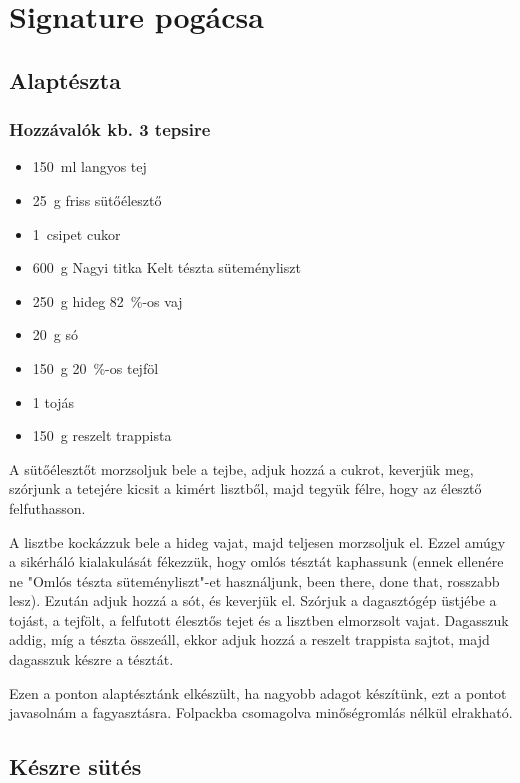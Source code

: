 \newpage
\section*{Signature pogácsa}

\subsection*{Alaptészta}
\subsubsection*{Hozzávalók kb. 3 tepsire}
\begin{itemize}
    \item \qty{150}{\ml} langyos tej
    \item \qty{25}{\g} friss sütőélesztő
    \item \qty{1}{csipet} cukor
    \item \qty{600}{\g} Nagyi titka Kelt tészta süteményliszt
    \item \qty{250}{\g} hideg \qty{82}{\percent}-os vaj
    \item \qty{20}{\g} só
    \item \qty{150}{g} \qty{20}{\percent}-os tejföl
    \item \num{1} tojás
    \item \qty{150}{\g} reszelt trappista
\end{itemize}

A sütőélesztőt morzsoljuk bele a tejbe, adjuk hozzá a cukrot, keverjük meg, szórjunk a tetejére kicsit a kimért lisztből, majd tegyük félre, hogy az élesztő felfuthasson.

A lisztbe kockázzuk bele a hideg vajat, majd teljesen morzsoljuk el. Ezzel amúgy a sikérháló kialakulását fékezzük, hogy omlós tésztát kaphassunk (ennek ellenére ne "Omlós tészta süteményliszt"-et használjunk, been there, done that, rosszabb lesz). Ezután adjuk hozzá a sót, és keverjük el. Szórjuk a dagasztógép üstjébe a tojást, a tejfölt, a felfutott élesztős tejet és a lisztben elmorzsolt vajat. Dagasszuk addig, míg a tészta összeáll, ekkor adjuk hozzá a reszelt trappista sajtot, majd dagasszuk készre a tésztát.

Ezen a ponton alaptésztánk elkészült, ha nagyobb adagot készítünk, ezt a pontot javasolnám a fagyasztásra. Folpackba csomagolva minőségromlás nélkül elrakható.

\subsection*{Készre sütés}
